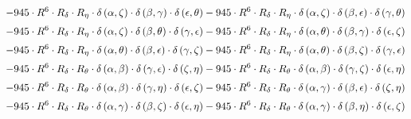 \begin{subequations}
\begin{gather}
 \\[0.2em] \notag 		 - 945 \cdot R^{6} \cdot R_{\delta{}} \cdot R_{\eta{}} \cdot \delta{}\left(\alpha{}, \zeta{}\right) \cdot \delta{}\left(\beta{}, \gamma{}\right) \cdot \delta{}\left(\epsilon{}, \theta{}\right)- 945 \cdot R^{6} \cdot R_{\delta{}} \cdot R_{\eta{}} \cdot \delta{}\left(\alpha{}, \zeta{}\right) \cdot \delta{}\left(\beta{}, \epsilon{}\right) \cdot \delta{}\left(\gamma{}, \theta{}\right) 
 \\[0.2em] \notag 		 - 945 \cdot R^{6} \cdot R_{\delta{}} \cdot R_{\eta{}} \cdot \delta{}\left(\alpha{}, \zeta{}\right) \cdot \delta{}\left(\beta{}, \theta{}\right) \cdot \delta{}\left(\gamma{}, \epsilon{}\right)- 945 \cdot R^{6} \cdot R_{\delta{}} \cdot R_{\eta{}} \cdot \delta{}\left(\alpha{}, \theta{}\right) \cdot \delta{}\left(\beta{}, \gamma{}\right) \cdot \delta{}\left(\epsilon{}, \zeta{}\right) 
 \\[0.2em] \notag 		 - 945 \cdot R^{6} \cdot R_{\delta{}} \cdot R_{\eta{}} \cdot \delta{}\left(\alpha{}, \theta{}\right) \cdot \delta{}\left(\beta{}, \epsilon{}\right) \cdot \delta{}\left(\gamma{}, \zeta{}\right)- 945 \cdot R^{6} \cdot R_{\delta{}} \cdot R_{\eta{}} \cdot \delta{}\left(\alpha{}, \theta{}\right) \cdot \delta{}\left(\beta{}, \zeta{}\right) \cdot \delta{}\left(\gamma{}, \epsilon{}\right) 
 \\[0.2em] \notag 		 - 945 \cdot R^{6} \cdot R_{\delta{}} \cdot R_{\theta{}} \cdot \delta{}\left(\alpha{}, \beta{}\right) \cdot \delta{}\left(\gamma{}, \epsilon{}\right) \cdot \delta{}\left(\zeta{}, \eta{}\right)- 945 \cdot R^{6} \cdot R_{\delta{}} \cdot R_{\theta{}} \cdot \delta{}\left(\alpha{}, \beta{}\right) \cdot \delta{}\left(\gamma{}, \zeta{}\right) \cdot \delta{}\left(\epsilon{}, \eta{}\right) 
 \\[0.2em] \notag 		 - 945 \cdot R^{6} \cdot R_{\delta{}} \cdot R_{\theta{}} \cdot \delta{}\left(\alpha{}, \beta{}\right) \cdot \delta{}\left(\gamma{}, \eta{}\right) \cdot \delta{}\left(\epsilon{}, \zeta{}\right)- 945 \cdot R^{6} \cdot R_{\delta{}} \cdot R_{\theta{}} \cdot \delta{}\left(\alpha{}, \gamma{}\right) \cdot \delta{}\left(\beta{}, \epsilon{}\right) \cdot \delta{}\left(\zeta{}, \eta{}\right) 
 \\[0.2em] \notag 		 - 945 \cdot R^{6} \cdot R_{\delta{}} \cdot R_{\theta{}} \cdot \delta{}\left(\alpha{}, \gamma{}\right) \cdot \delta{}\left(\beta{}, \zeta{}\right) \cdot \delta{}\left(\epsilon{}, \eta{}\right)- 945 \cdot R^{6} \cdot R_{\delta{}} \cdot R_{\theta{}} \cdot \delta{}\left(\alpha{}, \gamma{}\right) \cdot \delta{}\left(\beta{}, \eta{}\right) \cdot \delta{}\left(\epsilon{}, \zeta{}\right) 

\end{gather}
\end{subequations}
